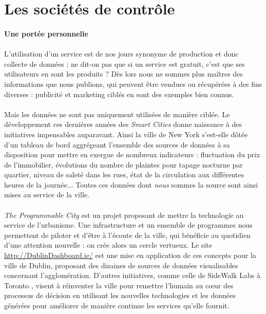 \section{Les sociétés de contrôle}

\paragraph{Une portée personnelle}

\paragraph{} L'utilisation d'un service est de nos jours synonyme de production et donc collecte de données ; ne dit-on
pas que si un service est gratuit, c'est que ses utilisateurs en sont les produits ? Dès lors nous ne sommes plus maîtres
des informations que nous publions, qui peuvent être vendues ou récupérées à des fins diverses : publicité et marketing
ciblés en sont des exemples bien connus.

\paragraph{} Mais les données ne sont pas uniquement utilisées de manière ciblée. Le développement ces dernières années 
des \emph{Smart Cities} donne naissance à des initiatives impensables auparavant. Ainsi la ville de New York s'est-elle
dôtée d'un tableau de bord \cite{ProgrammableCity1} aggrégeant l'ensemble des sources de données à sa disposition pour 
mettre en exergue de nombreux indicateurs : fluctuation du prix de l'immobilier, évolutions du nombre de plaintes pour 
tapage nocturne par quartier, niveau de saleté dans les rues, état de la circulation aux différentes heures de la 
journée... Toutes ces données dont \emph{nous} sommes la source sont ainsi mises au service de la ville.

\paragraph{} \emph{The Programmable City} \cite{ProgrammableCity0} est un projet proposant de mettre la technologie au
service de l'urbanisme. Une infrastructure et un ensemble de programmes nous permettent de piloter et d'être à l'écoute
de la ville, qui bénéficie au quotidien d'une attention nouvelle : on crée alors un cercle vertueux. Le site
\url{http://DublinDashboard.ie/} est une mise en application de ces concepts pour la ville de Dublin, proposant des
dizaines de sources de données visualisables concernant l'agglomération. D'autres initiatives, comme celle de SideWalk Labs
à Toronto \cite{ProgrammableCity3}, visent à réinventer la ville pour remettre l'humain au c\oe{}ur des processus de
décision en utilisant les nouvelles technologies et les données générées pour améliorer de manière continue les services
qu'elle fournit.

